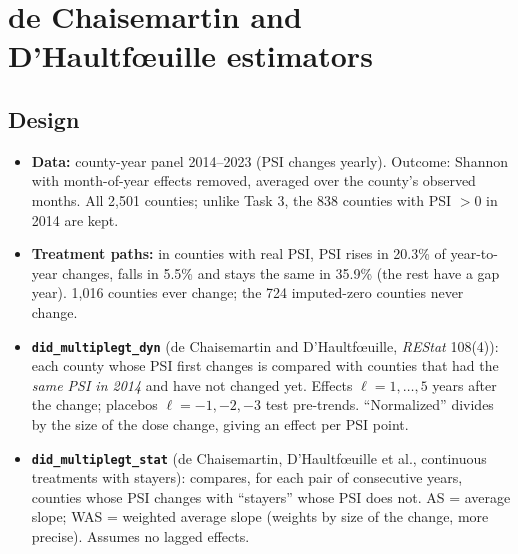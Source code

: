 \documentclass[11pt]{article}
\begin{document}
\section{de Chaisemartin and D'Haultf\oe uille estimators}
\subsection{Design}
\begin{itemize}[leftmargin=14pt,itemsep=1pt]
\item \textbf{Data:} county-year panel 2014--2023 (PSI changes yearly). Outcome: Shannon with month-of-year effects removed, averaged over the county's observed months. All 2,501 counties; unlike Task 3, the 838 counties with PSI $>0$ in 2014 are kept.
\item \textbf{Treatment paths:} in counties with real PSI, PSI rises in 20.3\% of year-to-year changes, falls in 5.5\% and stays the same in 35.9\% (the rest have a gap year). 1,016 counties ever change; the 724 imputed-zero counties never change.
\item \textbf{\texttt{did\_multiplegt\_dyn}} (de Chaisemartin and D'Haultf\oe uille, \textit{REStat} 108(4)): each county whose PSI first changes is compared with counties that had the \emph{same PSI in 2014} and have not changed yet. Effects $\ell=1,\dots,5$ years after the change; placebos $\ell=-1,-2,-3$ test pre-trends. ``Normalized'' divides by the size of the dose change, giving an effect per PSI point.
\item \textbf{\texttt{did\_multiplegt\_stat}} (de Chaisemartin, D'Haultf\oe uille et al., continuous treatments with stayers): compares, for each pair of consecutive years, counties whose PSI changes with ``stayers'' whose PSI does not. AS = average slope; WAS = weighted average slope (weights by size of the change, more precise). Assumes no lagged effects.
\end{itemize}
\end{document}
